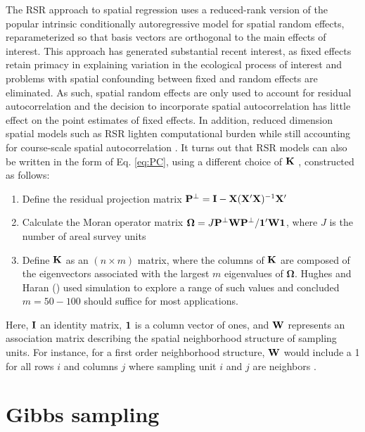 \documentclass[12pt,fleqn]{article}
\begin{document}
\begin{flushleft}
\hspace{.5in}The RSR approach to spatial regression uses a reduced-rank version of the popular intrinsic conditionally autoregressive \citep[ICAR;][]{Besag1995,RueHeld2005} model for spatial random effects, reparameterized so that basis vectors are orthogonal to the main effects of interest.  This approach has generated substantial recent interest, as fixed effects retain primacy in explaining variation in the ecological process of interest and problems with spatial confounding between fixed and random effects are eliminated. As such, spatial random effects are only used to account for residual autocorrelation \citep{Reich2006,Hodges2010} and the decision to incorporate spatial autocorrelation has little effect on the point estimates of fixed effects.  In addition, reduced dimension spatial models such as RSR lighten computational burden while still accounting for course-scale spatial autocorrelation \citep[see e.g.][]{LatimerEtAl2009,Wikle2010,Hughes2013}.  It turns out that RSR models can also be written in the form of Eq. \ref{eq:PC}, using a
different choice of ${\bf K}$ \citep{Hughes2013}, constructed as follows:
\begin{enumerate}
  \item Define the residual projection matrix ${\bf P}^\perp={\bf I}-{\bf X}({\bf X}^\prime{\bf X})^{-1}{\bf X}^\prime$
  \item Calculate the Moran operator matrix $\boldsymbol{\Omega}=J{\bf P}^\perp {\bf W}{\bf P}^\perp/{\bf 1}^\prime {\bf W} {\bf 1}$, where $J$ is the number of areal survey units
  \item Define ${\bf K}$ as an $(n \times m)$ matrix, where the columns of ${\bf K}$ are composed of the eigenvectors  associated with the largest $m$ eigenvalues of $\boldsymbol{\Omega}$. Hughes and Haran (\citeyear{Hughes2013}) used simulation to explore a range of such values and concluded $m=50-100$ should suffice for most applications.
\end{enumerate}
Here, ${\bf I}$ an identity matrix, ${\bf 1}$ is a column vector of ones, and ${\bf W}$ represents an association matrix describing the spatial neighborhood structure of sampling units.  For instance, for a first order neighborhood structure, ${\bf W}$ would include a 1 for all rows $i$ and columns $j$ where sampling unit $i$ and $j$ are neighbors \citep[see][for alternative association matrices]{RueHeld2005}.

\section{Gibbs sampling}


\end{flushleft}
\end{document}

